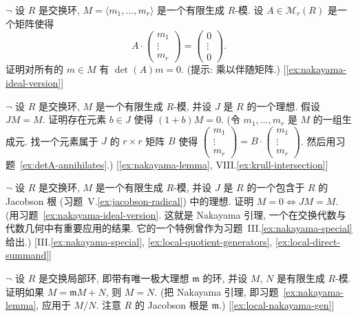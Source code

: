 \begin{prob}
\label{ex:detA-annihilates}
$\neg$ 设 $R$ 是交换环, $M=\langle m_1,\ldots,m_r\rangle$ 是一个有限生成 $R$-模. 设 $A\in\mathcal{M}_r(R)$ 是一个矩阵使得
\[
A\cdot\begin{pmatrix} m_1\\ \vdots\\ m_r\end{pmatrix}=\begin{pmatrix} 0\\ \vdots\\ 0\end{pmatrix}.
\]
证明对所有的 $m\in M$ 有 $\det(A)m=0$. (提示: 乘以伴随矩阵.) [\ref{ex:nakayama-ideal-version}]
\end{prob}

\begin{prob}
\label{ex:nakayama-ideal-version}
$\neg$ 设 $R$ 是交换环, $M$ 是一个有限生成 $R$-模, 并设 $J$ 是 $R$ 的一个理想. 假设 $JM=M$. 证明存在元素 $b\in J$ 使得 $(1+b)M=0$. (令 $m_1,\ldots,m_r$ 是 $M$ 的一组生成元. 找一个元素属于 $J$ 的 $r\times r$ 矩阵 $B$ 使得 $\begin{pmatrix} m_1\\ \vdots\\ m_r\end{pmatrix}=B\cdot\begin{pmatrix} m_1\\ \vdots\\ m_r\end{pmatrix}$. 然后用习题~\ref{ex:detA-annihilates}.) [\ref{ex:nakayama-lemma}, VIII.\ref{ex:krull-intersection}]
\end{prob}

\begin{prob}
\label{ex:nakayama-lemma}
$\neg$ 设 $R$ 是交换环, $M$ 是一个有限生成 $R$-模, 并设 $J$ 是 $R$ 的一个包含于 $R$ 的 Jacobson 根 (习题~V.\ref{ex:jacobson-radical}) 中的理想. 证明 $M=0\iff JM=M$. (用习题~\ref{ex:nakayama-ideal-version}. 这就是 Nakayama 引理, 一个在交换代数与代数几何中有重要应用的结果. 它的一个特例曾作为习题~III.\ref{ex:nakayama-special} 给出.) [III.\ref{ex:nakayama-special}, \ref{ex:local-quotient-generators}, \ref{ex:local-direct-summand}]
\end{prob}

\begin{prob}
\label{ex:local-quotient-generators}
$\neg$ 设 $R$ 是交换局部环, 即带有唯一极大理想 $\mathfrak{m}$ 的环, 并设 $M$, $N$ 是有限生成 $R$-模. 证明如果 $M=\mathfrak{m}M+N$, 则 $M=N$. (把 Nakayama 引理, 即习题~\ref{ex:nakayama-lemma}, 应用于 $M/N$. 注意 $R$ 的 Jacobson 根是 $\mathfrak{m}$.) [\ref{ex:local-nakayama-gen}]
\end{prob}


